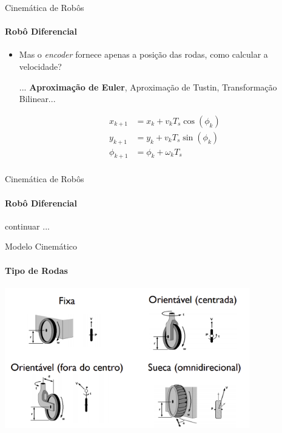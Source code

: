 \documentclass{beamer}
\begin{document}
\begin{frame}{Cinemática de Robôs}
    \framesubtitle{Robô Diferencial}
    \begin{itemize}
        \item Mas o \textit{encoder} fornece apenas a posição das rodas, como calcular a velocidade?
        
        ... \textbf{Aproximação de Euler}, Aproximação de Tustin, Transformação Bilinear...

        \begin{equation*}
            \begin{split}
                x_{k+1} &= x_k + v_k T_s\cos(\phi_k) \\
                y_{k+1} &= y_k + v_k T_s\sin(\phi_k) \\
                \phi_{k+1} &= \phi_k + \omega_k T_s \\
            \end{split}
        \end{equation*}
    \end{itemize}
\end{frame}


\begin{frame}{Cinemática de Robôs}
    \framesubtitle{Robô Diferencial}
    
    continuar ...

\end{frame}



\begin{frame}{Modelo Cinemático}
    \framesubtitle{Tipo de Rodas}
    \begin{center}
        \includegraphics[width=0.8\textwidth]{images/tipo_de_rodas.png}
    \end{center}
\end{frame}
\end{document}
